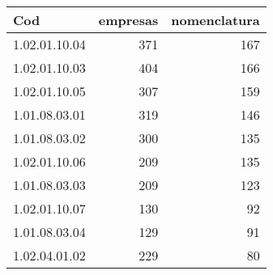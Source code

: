\begin{table}[ht]
\centering
\begin{tabular}{lrr}
  \hline
Cod & empresas & nomenclatura \\ 
  \hline
1.02.01.10.04 & 371 & 167 \\ 
  1.02.01.10.03 & 404 & 166 \\ 
  1.02.01.10.05 & 307 & 159 \\ 
  1.01.08.03.01 & 319 & 146 \\ 
  1.01.08.03.02 & 300 & 135 \\ 
  1.02.01.10.06 & 209 & 135 \\ 
  1.01.08.03.03 & 209 & 123 \\ 
  1.02.01.10.07 & 130 &  92 \\ 
  1.01.08.03.04 & 129 &  91 \\ 
  1.02.04.01.02 & 229 &  80 \\ 
   \hline
\end{tabular}
\end{table}
